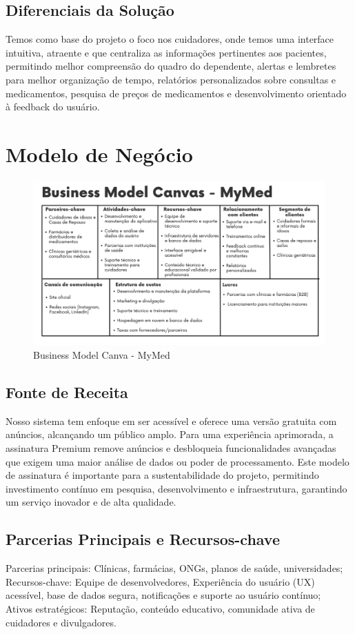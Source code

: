 \subsection*{Diferenciais da Solução}
Temos como base do projeto o foco nos cuidadores, onde temos uma interface intuitiva, atraente e que centraliza as informações pertinentes aos pacientes, permitindo melhor compreensão do quadro do dependente, alertas e lembretes para melhor organização de tempo, relatórios personalizados sobre consultas e medicamentos, pesquisa de preços de medicamentos e desenvolvimento orientado à feedback do usuário. 

\section{Modelo de Negócio}
\begin{figure}[!htbp]
    \centering
    \includegraphics[width=0.75\linewidth]{Figuras/BMC.png}
    \caption{Business Model Canva - MyMed}
\end{figure}

\subsection*{Fonte de Receita}
Nosso sistema tem enfoque em ser acessível e oferece uma versão gratuita com anúncios, alcançando um público amplo. Para uma experiência aprimorada, a assinatura Premium remove anúncios e desbloqueia funcionalidades avançadas que exigem uma maior análise de dados ou poder de processamento. Este modelo de assinatura é importante para a sustentabilidade do projeto, permitindo investimento contínuo em pesquisa, desenvolvimento e infraestrutura, garantindo um serviço inovador e de alta qualidade.

\subsection*{Parcerias Principais e Recursos-chave}
Parcerias principais: Clínicas, farmácias, ONGs, planos de saúde, universidades; \\
Recursos-chave: Equipe de desenvolvedores, Experiência do usuário (UX) acessível, base de dados segura, notificações e suporte ao usuário contínuo; \\
Ativos estratégicos: Reputação, conteúdo educativo, comunidade ativa de cuidadores e divulgadores.\\


